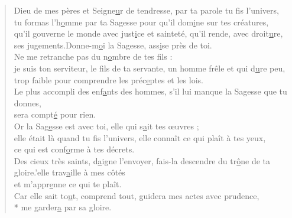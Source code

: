 \begin{verse}
Dieu de mes pères et Seigne\underline{u}r de tendresse,\psalmstar
par ta parole tu f\underline{i}s l'univers,\\
tu formas l'h\underline{o}mme par ta Sagesse\psalmstar
pour qu'il dom\underline{i}ne sur tes créatures,\\
qu'il gouverne le monde avec just\underline{i}ce et sainteté,\psalmstar
qu'il rende, avec droit\underline{u}re, ses jugements.\n\n{}Donne-m\underline{o}i la Sagesse,\psalmstar
ass\underline{i}se près de toi.\\

Ne me retranche pas du n\underline{o}mbre de tes fils :\\
je suis ton serviteur, le f\underline{i}ls de ta servante,\psalmstar
un homme frêle et qui d\underline{u}re peu,\\
trop faible pour comprendre les préc\underline{e}ptes et les lois.\\
Le plus accompli des enf\underline{a}nts des hommes, \psalmstar
s'il lui manque la Sagesse que tu donnes,\\
sera compt\underline{é} pour rien.\\

Or la Sag\underline{e}sse est avec toi,\psalmstar
elle qui s\underline{a}it tes œuvres ;\\
elle était là quand tu f\underline{i}s l'univers, \psalmstar
elle connaît ce qui plaît à tes yeux,\\
ce qui est conf\underline{o}rme à tes décrets.\\
Des cieux très saints, d\underline{a}igne l'envoyer,\psalmstar
fais-la descendre du tr\underline{ô}ne de ta gloire.\n\nQu'elle trav\underline{a}ille à mes côtés\\
et m'appr\underline{e}nne ce qui te plaît.\\
Car elle sait to\underline{u}t, comprend tout, \psalmstar
guidera mes actes avec prudence,\\*
me garder\underline{a} par sa gloire.
\end{verse}
